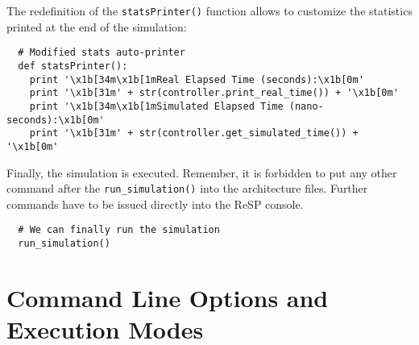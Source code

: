 \indent The redefinition of the \texttt{statsPrinter()} function allows to customize the statistics printed at the end of the simulation:

\scriptsize
\begin{verbatim}
  # Modified stats auto-printer
  def statsPrinter():
    print '\x1b[34m\x1b[1mReal Elapsed Time (seconds):\x1b[0m'
    print '\x1b[31m' + str(controller.print_real_time()) + '\x1b[0m'
    print '\x1b[34m\x1b[1mSimulated Elapsed Time (nano-seconds):\x1b[0m'
    print '\x1b[31m' + str(controller.get_simulated_time()) + '\x1b[0m'
\end{verbatim}
\normalsize

\indent Finally, the simulation is executed. Remember, it is forbidden to put any other command after the \texttt{run\_simulation()} into the architecture files. Further commands have to be issued directly into the ReSP console.

\scriptsize
\begin{verbatim}
  # We can finally run the simulation
  run_simulation()
\end{verbatim}
\normalsize

\section{Command Line Options and Execution Modes}
\label{general:modes}
